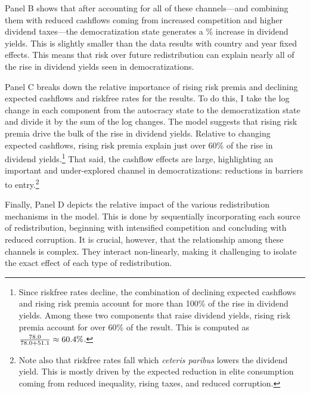 Panel B shows that after accounting for all of these channels---and combining them with reduced cashflows coming from increased competition and higher dividend taxes---the democratization state generates a \tabTwelveDYChangeModel\% increase in dividend yields. This is slightly smaller than the data results with country and year fixed effects. This means that risk over future redistribution can explain nearly all of the rise in dividend yields seen in democratizations. 



Panel C breaks down the relative importance of rising risk premia and declining expected cashflows and riskfree rates for the results. To do this, I take the log change in each component from the autocracy state to the democratization state and divide it by the sum of the log changes. The model suggests that rising risk premia drive the bulk of the rise in dividend yields. Relative to changing expected cashflows, rising risk premia explain just over 60\% of the rise in dividend yields.\footnote{Since riskfree rates decline, the combination of declining expected cashflows and rising risk premia account for more than 100\% of the rise in dividend yields. Among these two components that raise dividend yields, rising risk premia account for over 60\% of the result. This is computed as $\frac{78.0}{78.0 + 51.1} \approx 60.4\%$.} That said, the cashflow effects are large, highlighting an important and under-explored channel in democratizations: reductions in barriers to entry.\footnote{Note also that riskfree rates fall which {\it ceteris paribus} lowers the dividend yield. This is mostly driven by the expected reduction in elite consumption coming from reduced inequality, rising taxes, and reduced corruption.}\label{footnote:clarify_effect}

Finally, Panel D depicts the relative impact of the various redistribution mechanisms in the model. This is done by sequentially incorporating each source of redistribution, beginning with intensified competition and concluding with reduced corruption. It is crucial, however, that the relationship among these channels is complex. They interact non-linearly, making it challenging to isolate the exact effect of each type of redistribution.

